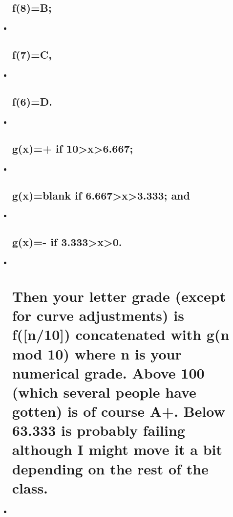 \documentclass[11pt]{article}
\begin{document}
\begin{itemize}
  \subsection{f(8)=B;}\label{f8b}
\item ~
  \subsection{f(7)=C,}\label{f7c}
\item ~
  \subsection{f(6)=D.}\label{f6d.}
\item ~
  \subsection{g(x)=+ if
  10\textgreater{}x\textgreater{}6.667;}\label{gx-if-10x6.667}
\item ~
  \subsection{g(x)=blank if 6.667\textgreater{}x\textgreater{}3.333;
  and}\label{gxblank-if-6.667x3.333-and}
\item ~
  \subsection{g(x)=- if
  3.333\textgreater{}x\textgreater{}0.}\label{gx--if-3.333x0.}
\item ~
  \section{Then your letter grade (except for curve adjustments) is
  f({[}n/10{]}) concatenated with g(n mod 10) where n is your numerical
  grade. Above 100 (which several people have gotten) is of course A+.
  Below 63.333 is probably failing although I might move it a bit
  depending on the rest of the
  class.}\label{then-your-letter-grade-except-for-curve-adjustments-is-fn10-concatenated-with-gn-mod-10-where-n-is-your-numerical-grade.-above-100-which-several-people-have-gotten-is-of-course-a.-below-63.333-is-probably-failing-although-i-might-move-it-a-bit-depending-on-the-rest-of-the-class.}
\item ~

\end{itemize}
\end{document}

